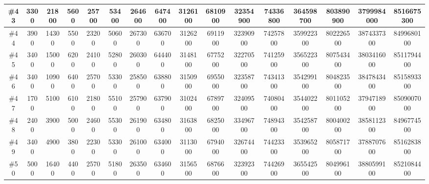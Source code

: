 \documentclass[titlepage]{article}
\begin{document}
\begin{landscape}
\begin{table}
\begin{tabular}{|c|c|c|c|c|c|c|c|c|c|c|c|c|c|c|c|}
				\hline
				\#43     & 3300   & 21800 & 5600  & 25700 & 53400 & 264600 & 647400 & 3126100 & 6810900 & 32354900 & 74336800 & 364598700 & 803890900 & 3799984000 & 8516675300  \\ 
				\hline
				\#44     & 3900   & 14300 & 5500  & 23200 & 50600 & 267300 & 636700 & 3126200 & 6911900 & 32390900 & 74257800 & 359922300 & 802226500 & 3874337300 & 8499680100  \\ 
				\hline
				\#45     & 3400   & 15000 & 6200  & 24100 & 52800 & 260300 & 644400 & 3148100 & 6775200 & 32270500 & 74125900 & 356522300 & 807543400 & 3803416000 & 8511794400  \\ 
				\hline
				\#46     & 3400   & 10900 & 6400  & 25700 & 53300 & 258500 & 638800 & 3150900 & 6955000 & 32358700 & 74341300 & 354299100 & 804823500 & 3847843400 & 8515893300  \\ 
				\hline
				\#47     & 1700   & 5100  & 6100  & 21800 & 55100 & 257900 & 637900 & 3102400 & 6789700 & 32409500 & 74080400 & 354402200 & 801105200 & 3794718900 & 8509007000  \\ 
				\hline
				\#48     & 2400   & 3900  & 5000  & 24600 & 55300 & 261900 & 634800 & 3163800 & 6825000 & 33496700 & 74894300 & 354258700 & 800400200 & 3858112300 & 8496774500  \\ 
				\hline
				\#49     & 3400   & 4900  & 3800  & 22300 & 53300 & 261000 & 634000 & 3113000 & 6794000 & 32674400 & 74423300 & 353965200 & 805871700 & 3788707600 & 8516283800  \\ 
				\hline
				\#50     & 5000   & 16400 & 4400  & 25700 & 51800 & 263500 & 634600 & 3156500 & 6876600 & 32392300 & 74426900 & 365542500 & 804996100 & 3880599100 & 8521084400  \\
				\hline
			\end{tabular}
		\end{table}
	\end{landscape}	
	
\end{document}
